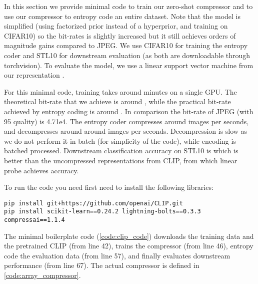 \documentclass[final]{article}
\begin{document}
In this section we provide minimal code to train our zero-shot compressor and to use our compressor to entropy code an entire dataset.
Note that the model is simplified (\eg using factorized prior instead of a hyperprior, and training on CIFAR10) so the bit-rates is slightly increased but it still achieves orders of magnitude gains compared to JPEG. 
We use CIFAR10 for training the entropy coder and STL10 for downstream evaluation (as both are downloadable through torchvision).
To evaluate the model, we use a linear support vector machine from our representation .

For this minimal code,
training takes around  minutes on a single GPU.
The theoretical bit-rate that we achieve is around , while the practical bit-rate achieved by entropy coding is around .
In comparison the bit-rate of JPEG (with 95 quality) is 4.71e4.
The entropy coder compresses around  images per seconds, and decompresses around around  images per seconds. Decompression is slow as we do not perform it in batch (for simplicity of the code), while encoding is batched processed.
Downstream classification accuracy on STL10 is  which is better than the uncompressed representations from CLIP, from which linear probe achieves  accuracy.

To run the code you need first need to install the following libraries:
\begin{verbatim}
pip install git+https://github.com/openai/CLIP.git
pip install scikit-learn==0.24.2 lightning-bolts==0.3.3 compressai==1.1.4
\end{verbatim}


The minimal boilerplate code (\cref{code:clip_code}) downloads the training data and the pretrained CLIP (from line 42), trains the compressor (from line 46), entropy code the evaluation data (from line 57), and finally evaluates downstream performance (from line 67).
The actual compressor is defined in \cref{code:array_compressor}.


\clearpage
{} 
\clearpage
{} 
\end{document}
